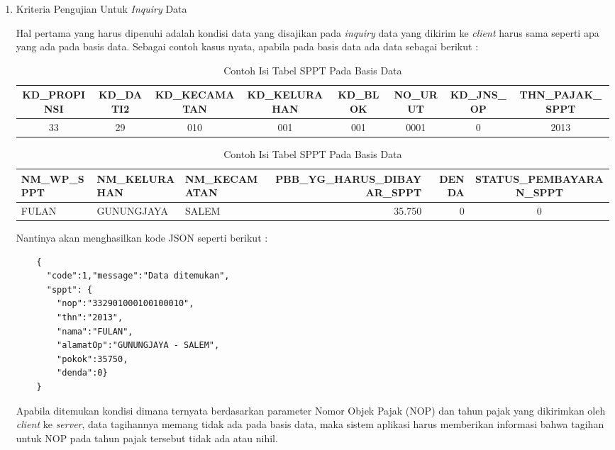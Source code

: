 \documentclass[pdftex,12pt, oneside]{article}
\begin{document}
\begin{enumerate}[1.]
  \item Kriteria Pengujian Untuk \textit{Inquiry} Data
  
  Hal pertama yang harus dipenuhi adalah kondisi data yang disajikan pada \textit{inquiry} data yang dikirim ke \textit{client} harus sama seperti apa yang ada pada basis data. Sebagai contoh kasus nyata, apabila pada basis data ada data sebagai berikut :
  \begin{table}[H]
    \resizebox{8cm}{!}
      {
        \begin{minipage}{1\textwidth}
        \begin{tabular}{|c|c|c|c|c|c|c|c|}
          \hline
          \textbf{KD\_PROPINSI} & \textbf{KD\_DATI2} & \textbf{KD\_KECAMATAN} & \textbf{KD\_KELURAHAN} & \textbf{KD\_BLOK} & \textbf{NO\_URUT} & \textbf{KD\_JNS\_OP} & \textbf{THN\_PAJAK\_SPPT} \\
          \hline \hline
          33 & 29 & 010 & 001 & 001 & 0001 & 0 & 2013 \\
          \hline
        \end{tabular}
  
        \begin{tabular}{|l|l|l|r|r|c|}
          \hline
      	  \textbf{NM\_WP\_SPPT} & \textbf{NM\_KELURAHAN} & \textbf{NM\_KECAMATAN} & \textbf{PBB\_YG\_HARUS\_DIBAYAR\_SPPT} & \textbf{DENDA} & \textbf{STATUS\_PEMBAYARAN\_SPPT} \\
   	      \hline \hline
       	  FULAN & GUNUNGJAYA & SALEM & 35.750 & 0 & 0 \\
       	  \hline
        \end{tabular}
        \centering
      \end{minipage}
    }
    \caption{Contoh Isi Tabel SPPT Pada Basis Data}
  \end{table}
  
  Nantinya akan menghasilkan kode JSON seperti berikut :
  
  \begin{lstlisting}
    {
      "code":1,"message":"Data ditemukan",
      "sppt": {
        "nop":"332901000100100010",
        "thn":"2013",
        "nama":"FULAN",
        "alamatOp":"GUNUNGJAYA - SALEM",
        "pokok":35750,
        "denda":0}
    }
  \end{lstlisting}
  
  
  Apabila ditemukan kondisi dimana ternyata berdasarkan parameter Nomor Objek Pajak (NOP) dan tahun pajak yang dikirimkan oleh \textit{client} ke \textit{server}, data tagihannya memang tidak ada pada basis data, maka sistem aplikasi harus memberikan informasi bahwa tagihan untuk NOP pada tahun pajak tersebut tidak ada atau nihil.
  

\end{enumerate}
\end{document}
